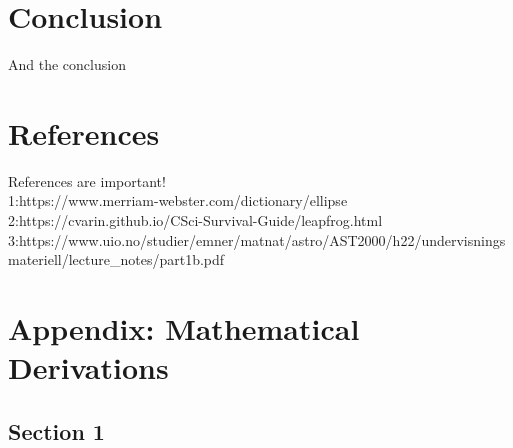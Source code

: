 \documentclass[reprint,english,notitlepage]{revtex4-2}
\begin{document}
\section{Conclusion}
And the conclusion


\section{References}
References are important!\\
1:\:https://www.merriam-webster.com/dictionary/ellipse\\
2:\:https://cvarin.github.io/CSci-Survival-Guide/leapfrog.html\\
3:\:https://www.uio.no/studier/emner/matnat/astro/AST2000/h22/undervisningsmateriell/lecture_notes/part1b.pdf

\section{Appendix: Mathematical Derivations}
	\subsection{Section 1}
\end{document}
